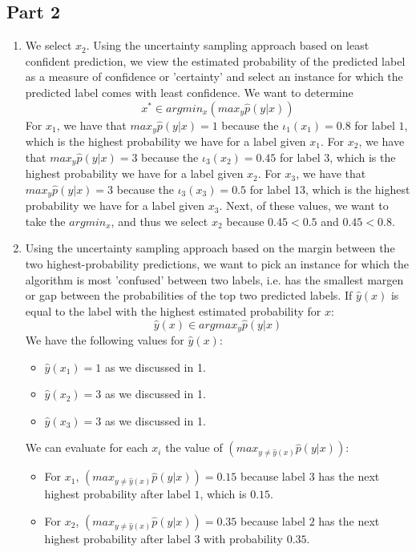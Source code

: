 \documentclass[english]{article}
\begin{document}
\subsection{Part 2}
\begin{enumerate}
    \item We select $x_2$. Using the uncertainty sampling approach based on least confident prediction, we view the estimated probability of the predicted label as a measure of confidence or 'certainty' and select an instance for which the predicted label comes with least confidence. We want to determine $$x^* \in argmin_x (max_y \hat{p}(y|x))$$
    For $x_1$, we have that $max_y\hat{p}(y|x) = 1$ because the $\iota_1(x_1) = 0.8$ for label $1$, which is the highest probability we have for a label given $x_1$.  For $x_2$, we have that $max_y\hat{p}(y|x) = 3$ because the $\iota_3(x_2) = 0.45$ for label $3$, which is the highest probability we have for a label given $x_2$.  For $x_3$, we have that $max_y\hat{p}(y|x) = 3$ because the $\iota_3(x_3) = 0.5$ for label $13$, which is the highest probability we have for a label given $x_3$. Next, of these values, we want to take the $argmin_x$, and thus we select $x_2$ because $0.45 < 0.5$ and $0.45 < 0.8$. 
    \item Using the uncertainty sampling approach based on the margin between the two highest-probability predictions, we want to pick an instance for which the algorithm is most 'confused' between two labels, i.e. has the smallest margen or gap between the probabilities of the top two predicted labels. If $\hat{y}(x)$ is equal to the label with the highest estimated probability for $x$: $$\hat{y}(x) \in argmax_y\hat{p}(y|x)$$
    We have the following values for $\hat{y}(x)$: 
    \begin{itemize}
    \item $\hat{y}(x_1) = 1$ as we discussed in 1.
    \item $\hat{y}(x_2) = 3$ as we discussed in 1.
    \item $\hat{y}(x_3) = 3$ as we discussed in 1.
    \end{itemize}
    We can evaluate for each $x_i$ the value of $(max_{y\neq\hat{y}(x)}\hat{p}(y|x))$:
    \begin{itemize}
    \item For $x_1$, $(max_{y\neq\hat{y}(x)}\hat{p}(y|x)) = 0.15$ because label $3$ has the next highest probability after label $1$, which is $0.15$. 
    \item For $x_2$, $(max_{y\neq\hat{y}(x)}\hat{p}(y|x)) = 0.35$ because label $2$ has the next highest probability after label $3$ with probability $0.35$. 

\end{itemize}
\end{enumerate}
\end{document}
